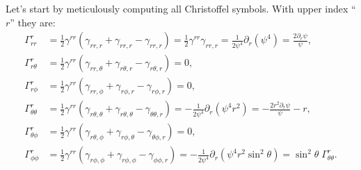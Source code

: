 \documentclass[aps,prd,preprint]{revtex4-1}
\begin{document}
Let's start by meticulously computing all Christoffel symbols. With upper index ``$r$'' they are:
\begin{align}
%
%
\Gamma^r_{rr} & = \frac{1}{2} \gamma^{rr} \left(
  \gamma_{rr,r} + \gamma_{rr,r} - \gamma_{rr,r} \right) =
\frac{1}{2} \gamma^{rr} \gamma_{rr, r} =
\frac{1}{2 \psi^4} \partial_r \left( \psi^4 \right) =
\frac{2 \partial_r \psi}{\psi}, \\
%
%
\Gamma^r_{r \theta} & = \frac{1}{2} \gamma^{rr} \left(
  \gamma_{rr, \theta} + \gamma_{r \theta, r} - \gamma_{r \theta, r} \right) = 0, \\
%
%
\Gamma^r_{r \phi} & =
  \frac{1}{2} \gamma^{rr} \left( \gamma_{rr, \phi} + \gamma_{r\phi, r} - \gamma_{r \phi, r} \right) = 0, \\
%
%
\Gamma^r_{\theta \theta} & =
  \frac{1}{2} \gamma^{rr} \left(
    \gamma_{r \theta, \theta} + \gamma_{r \theta, \theta} - \gamma_{\theta \theta, r} \right) =
-\frac{1}{2 \psi^4} \partial_r \left( \psi^4 r^2 \right) =
-\frac{2 r^2 \partial_r \psi}{\psi} - r, \\
%
%
\Gamma^r_{\theta \phi} & =
  \frac{1}{2} \gamma^{rr} \left(
    \gamma_{r \theta, \phi} + \gamma_{r \phi, \theta} - \gamma_{\theta \phi, r} \right) = 0, \\
%
%
\Gamma^r_{\phi \phi} & =
  \frac{1}{2} \gamma^{rr} \left(
    \gamma_{r \phi, \phi} + \gamma_{r \phi, \phi} - \gamma_{\phi \phi, r} \right) =
-\frac{1}{2 \psi^4} \partial_r \left( \psi^4 r^2 \sin^2\theta \right) = \sin^2 \theta \; \Gamma^r_{\theta \theta}.
\end{align}
\end{document}
